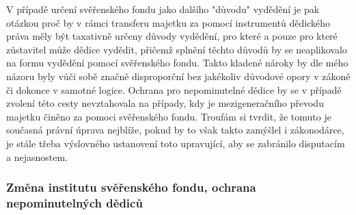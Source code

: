 \documentclass{article}
\begin{document}
V případě určení svěřenského fondu jako dalšího "důvodu" vydědění je pak otázkou proč by v rámci transferu majetku za pomocí instrumentů dědického práva měly být taxativně určeny důvody vydědění, pro které a pouze pro které zůstavitel může dědice vydědit, přičemž splnění těchto důvodů by se neaplikovalo na formu vydědění pomocí svěřenského fondu. Takto kladené nároky by dle mého názoru byly vůči sobě značně disproporční bez jakékoliv důvodové opory v zákoně či dokonce v samotné logice. Ochrana pro nepominutelné dědice by se v případě zvolení této cesty nevztahovala na případy, kdy je mezigeneračního převodu majetku činěno za pomoci svěřenského fondu. Troufám si tvrdit, že tomuto je současná právní úprava nejblíže, pokud by to však takto zamýšlel i zákonodárce, je stále třeba výslovného ustanovení toto upravující, aby se zabránilo disputacím a nejasnostem.\\



\subsubsection{Změna institutu svěřenského fondu, ochrana nepominutelných dědiců}




\end{document}
